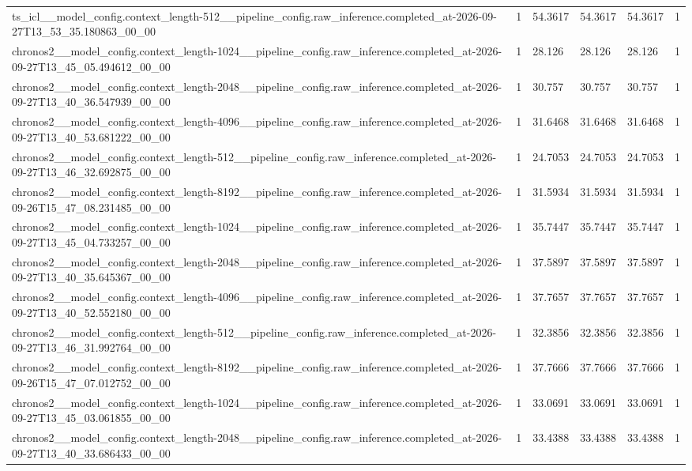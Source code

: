 \begin{tabular}{llllll}
ts\_icl\_\_model\_config.context\_length-512\_\_pipeline\_config.raw\_inference.completed\_at-2026-09-27T13\_53\_35.180863\_00\_00 & 1 & 54.3617 & 54.3617 & 54.3617 & 1 \\
chronos2\_\_model\_config.context\_length-1024\_\_pipeline\_config.raw\_inference.completed\_at-2026-09-27T13\_45\_05.494612\_00\_00 & 1 & 28.126 & 28.126 & 28.126 & 1 \\
chronos2\_\_model\_config.context\_length-2048\_\_pipeline\_config.raw\_inference.completed\_at-2026-09-27T13\_40\_36.547939\_00\_00 & 1 & 30.757 & 30.757 & 30.757 & 1 \\
chronos2\_\_model\_config.context\_length-4096\_\_pipeline\_config.raw\_inference.completed\_at-2026-09-27T13\_40\_53.681222\_00\_00 & 1 & 31.6468 & 31.6468 & 31.6468 & 1 \\
chronos2\_\_model\_config.context\_length-512\_\_pipeline\_config.raw\_inference.completed\_at-2026-09-27T13\_46\_32.692875\_00\_00 & 1 & 24.7053 & 24.7053 & 24.7053 & 1 \\
chronos2\_\_model\_config.context\_length-8192\_\_pipeline\_config.raw\_inference.completed\_at-2026-09-26T15\_47\_08.231485\_00\_00 & 1 & 31.5934 & 31.5934 & 31.5934 & 1 \\
chronos2\_\_model\_config.context\_length-1024\_\_pipeline\_config.raw\_inference.completed\_at-2026-09-27T13\_45\_04.733257\_00\_00 & 1 & 35.7447 & 35.7447 & 35.7447 & 1 \\
chronos2\_\_model\_config.context\_length-2048\_\_pipeline\_config.raw\_inference.completed\_at-2026-09-27T13\_40\_35.645367\_00\_00 & 1 & 37.5897 & 37.5897 & 37.5897 & 1 \\
chronos2\_\_model\_config.context\_length-4096\_\_pipeline\_config.raw\_inference.completed\_at-2026-09-27T13\_40\_52.552180\_00\_00 & 1 & 37.7657 & 37.7657 & 37.7657 & 1 \\
chronos2\_\_model\_config.context\_length-512\_\_pipeline\_config.raw\_inference.completed\_at-2026-09-27T13\_46\_31.992764\_00\_00 & 1 & 32.3856 & 32.3856 & 32.3856 & 1 \\
chronos2\_\_model\_config.context\_length-8192\_\_pipeline\_config.raw\_inference.completed\_at-2026-09-26T15\_47\_07.012752\_00\_00 & 1 & 37.7666 & 37.7666 & 37.7666 & 1 \\
chronos2\_\_model\_config.context\_length-1024\_\_pipeline\_config.raw\_inference.completed\_at-2026-09-27T13\_45\_03.061855\_00\_00 & 1 & 33.0691 & 33.0691 & 33.0691 & 1 \\
chronos2\_\_model\_config.context\_length-2048\_\_pipeline\_config.raw\_inference.completed\_at-2026-09-27T13\_40\_33.686433\_00\_00 & 1 & 33.4388 & 33.4388 & 33.4388 & 1 \\

\end{tabular}

